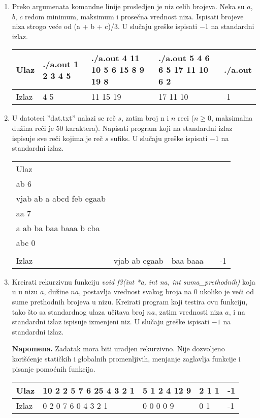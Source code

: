 \begin{enumerate}
\item Preko argumenata komandne linije prosledjen je niz celih brojeva. Neka su $a$, $b$, $c$ redom minimum, maksimum i prose\v cna vrednost niza. Ispisati brojeve niza strogo ve\' ce od (a + b + c)/3. U slu\v caju gre\v ske ispisati $-1$ na standardni izlaz. 

\small
\begin{tabular}{ |l|l|l|l|l| }
\hline 
  Ulaz & ./a.out 1 2 3 4 5& ./a.out 4 11 10 5 6 15 8 9 19 8 & ./a.out 5 4 6 6 5 17 11 10 6 2 & ./a.out \\ \hline 
  Izlaz &4 5  &11 15 19 & 17 11 10&  -1\\ \hline 
\end{tabular}
\normalsize

\item  U datoteci ''dat.txt'' nalazi se re\v c $s$, zatim broj n i $n$ reci ($n \ge 0$, maksimalna du\v zina re\v ci je 50 karaktera). Napisati program koji na standardni izlaz ispisuje sve re\v ci kojima je re\v c $s$ sufiks. U slu\v caju gre\v ske ispisati $-1$ na standardni izlaz. 


\small
\begin{tabular}{ |l|l|l|l|l| }
\hline 
  Ulaz  &  
  \mlcell{dat.txt:\\ab 6 \\vjab ab a abcd feb egaab}&   
  \mlcell{dat.txt:\\ aa 7\\ a ab ba baa baaa b cba }& 
  \mlcell{dat.txt:\\ abc  0\\} &
  \\ 
  \hline 
  Izlaz &   
  vjab ab egaab &  
  baa baaa &  
  & 
  -1\\ 
  \hline 
\end{tabular}
\normalsize

\item 
Kreirati rekurzivnu funkciju \emph{void f3(int *a, int na, int suma\_prethodnih)} koja u u nizu $a$, du\v zine $na$, 
postavlja vrednost svakog broja na 0 ukoliko je ve\' ci od sume prethodnih brojeva u nizu. Kreirati program koji testira 
ovu funkciju, tako \v sto sa standardnog ulaza u\v citava broj $na$, zatim vrednosti niza $a$, i na standardni izlaz 
ispisuje izmenjeni niz. U slu\v caju gre\v ske ispisati $-1$ na standardni izlaz. 

\textbf{Napomena.} Zadatak mora biti uradjen rekurzivno. Nije dozvoljeno kori\v s\' cenje stati\v ckih i globalnih promenljivih, menjanje zaglavlja funkcije i pisanje pomo\' cnih funkcija. 

\small
\begin{tabular}{ |l|l|l|l|l| }
\hline 
  Ulaz  & 10 2 2 5 7 6 25 4 3 2 1 & 5 1 2 4 12 9 & 2 1 1& -1 \\ \hline 
  Izlaz & 0 2 0 7 6 0 4 3 2 1      & 0 0 0 0 9  &  0 1 & -1 \\ \hline  
\end{tabular}
\normalsize
\end{enumerate}

